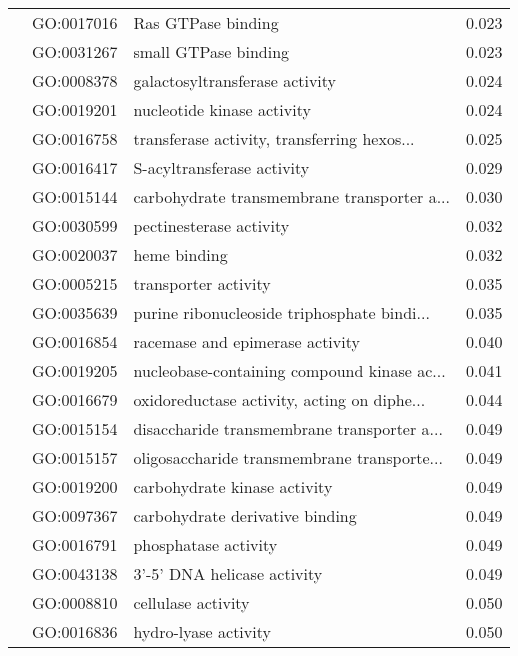 \begin{longtable}{lllr}
   & GO:0017016 &                           Ras GTPase binding &         0.023 \\
   & GO:0031267 &                         small GTPase binding &         0.023 \\
   & GO:0008378 &               galactosyltransferase activity &         0.024 \\
   & GO:0019201 &                   nucleotide kinase activity &         0.024 \\
   & GO:0016758 &  transferase activity, transferring hexos... &         0.025 \\
   & GO:0016417 &                   S-acyltransferase activity &         0.029 \\
   & GO:0015144 &  carbohydrate transmembrane transporter a... &         0.030 \\
   & GO:0030599 &                      pectinesterase activity &         0.032 \\
   & GO:0020037 &                                 heme binding &         0.032 \\
   & GO:0005215 &                         transporter activity &         0.035 \\
   & GO:0035639 &  purine ribonucleoside triphosphate bindi... &         0.035 \\
   & GO:0016854 &              racemase and epimerase activity &         0.040 \\
   & GO:0019205 &  nucleobase-containing compound kinase ac... &         0.041 \\
   & GO:0016679 &  oxidoreductase activity, acting on diphe... &         0.044 \\
   & GO:0015154 &  disaccharide transmembrane transporter a... &         0.049 \\
   & GO:0015157 &  oligosaccharide transmembrane transporte... &         0.049 \\
   & GO:0019200 &                 carbohydrate kinase activity &         0.049 \\
   & GO:0097367 &              carbohydrate derivative binding &         0.049 \\
   & GO:0016791 &                         phosphatase activity &         0.049 \\
   & GO:0043138 &                  3'-5' DNA helicase activity &         0.049 \\
   & GO:0008810 &                           cellulase activity &         0.050 \\
   & GO:0016836 &                         hydro-lyase activity &         0.050 \\

\end{longtable}
